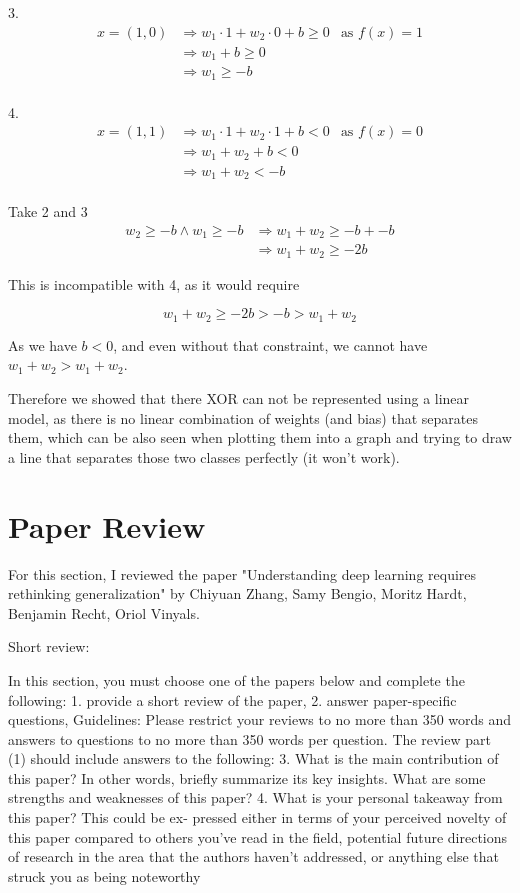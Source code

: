 \documentclass[11pt]{article}
\begin{document}
3.
\begin{align*}
x = (1, 0) &\Rightarrow w_1 \cdot 1 + w_2 \cdot 0 + b \geq 0 &\text{as } f(x) = 1 \\
&\Rightarrow w_1 + b \geq 0 \\
&\Rightarrow w_1 \geq -b \\
\end{align*}

4.
\begin{align*}
x = (1, 1) &\Rightarrow w_1 \cdot 1 + w_2 \cdot 1 + b < 0 &\text{as } f(x) = 0 \\
&\Rightarrow w_1 + w_2 + b < 0 \\
&\Rightarrow w_1 + w_2 < -b \\
\end{align*}

Take 2 and 3
\begin{align*}
w_2 \geq -b \land w_1 \geq -b &\Rightarrow w_1 + w_2 \geq -b + -b \\
&\Rightarrow w_1 + w_2 \geq -2b \
\end{align*}

This is incompatible with 4, as it would require

$$w_1 + w_2 \ge -2b > -b > w_1 + w_2$$

As we have $b < 0$, and even without that constraint, we cannot have $w_1 + w_2 > w_1 + w_2$.

Therefore we showed that there XOR can not be represented using a linear model, as there is no linear combination of weights (and bias) that separates them, which can be also seen when plotting them into a graph and trying to draw a line that separates those two classes perfectly (it won't work).

\newpage

\section{Paper Review}
For this section, I reviewed the paper "Understanding deep learning requires rethinking generalization" by Chiyuan Zhang, Samy Bengio, Moritz Hardt, Benjamin Recht, Oriol Vinyals.

Short review:

In this section, you must choose one of the papers below and complete the
following:
1. provide a short review of the paper,
2. answer paper-specific questions,
Guidelines: Please restrict your reviews to no more than 350 words and
answers to questions to no more than 350 words per question. The review
part (1) should include answers to the following:
3. What is the main contribution of this paper? In other words, briefly
summarize its key insights. What are some strengths and weaknesses
of this paper?
4. What is your personal takeaway from this paper? This could be ex-
pressed either in terms of your perceived novelty of this paper compared
to others you’ve read in the field, potential future directions of research
in the area that the authors haven’t addressed, or anything else that
struck you as being noteworthy
\end{document}

